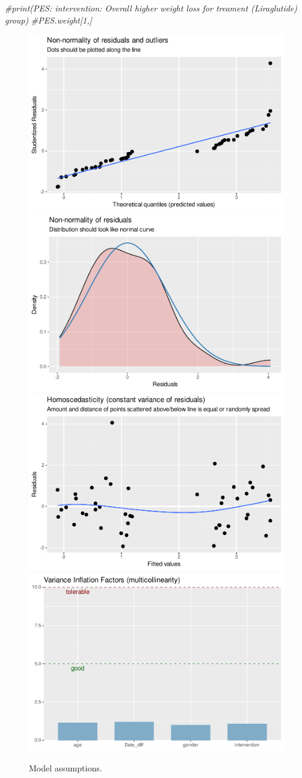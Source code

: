 \documentclass[
]{article}
\newenvironment{Shaded}{\begin{snugshade}}{\end{snugshade}}
\newcommand{\CommentTok}[1]{\textcolor[rgb]{0.56,0.35,0.01}{\textit{#1}}}
\begin{document}
\begin{Shaded}
\begin{Highlighting}[]
\CommentTok{\#print(\textquotesingle{}PES: intervention: Overall higher weight loss for treament (Liraglutide) group\textquotesingle{})}
\CommentTok{\#PES.weight[1,]}
\end{Highlighting}
\end{Shaded}

\begin{figure}

{\centering \includegraphics[width=0.25\linewidth]{OBIWAN_LIRA_files/figure-latex/unnamed-chunk-2-1} \includegraphics[width=0.25\linewidth]{OBIWAN_LIRA_files/figure-latex/unnamed-chunk-2-2} \includegraphics[width=0.25\linewidth]{OBIWAN_LIRA_files/figure-latex/unnamed-chunk-2-3} \includegraphics[width=0.25\linewidth]{OBIWAN_LIRA_files/figure-latex/unnamed-chunk-2-4} 

}

\caption{Model assumptions.}\label{fig:unnamed-chunk-2}
\end{figure}
\end{document}
